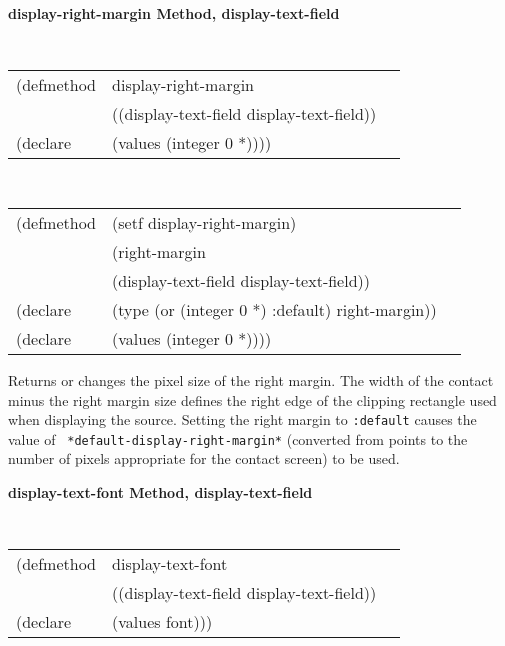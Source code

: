 {\samepage  
{\large {\bf display-right-margin \hfill Method, display-text-field}}
\begin{flushright} \parbox[t]{6.125in}{
\tt
\begin{tabular}{lll}
\raggedright
(defmethod & display-right-margin & \\
& ((display-text-field  display-text-field)) \\
(declare & (values (integer 0 *))))
\end{tabular}
\rm

}\end{flushright}}

\begin{flushright} \parbox[t]{6.125in}{
\tt
\begin{tabular}{lll}
\raggedright
(defmethod & (setf display-right-margin) & \\
         & (right-margin \\
         & (display-text-field  display-text-field)) \\
(declare &(type (or (integer 0 *) :default)  right-margin))\\
(declare & (values (integer 0 *))))
\end{tabular}
\rm}
\end{flushright}

\begin{flushright} \parbox[t]{6.125in}{
Returns or changes the pixel size of the
right margin.  The width of the contact minus the right margin size defines
the right edge of the clipping rectangle used when displaying the source.
Setting the right margin to {\tt :default} causes the value of {\tt
*default-display-right-margin*} (converted from points to the number of pixels
appropriate for the contact screen) to be used.
}
\end{flushright}




{\samepage  
{\large {\bf display-text-font \hfill Method, display-text-field}}
\begin{flushright} \parbox[t]{6.125in}{
\tt
\begin{tabular}{lll}
\raggedright
(defmethod & display-text-font & \\
& ((display-text-field  display-text-field)) \\
(declare & (values font)))
\end{tabular}
\rm

}\end{flushright}}

